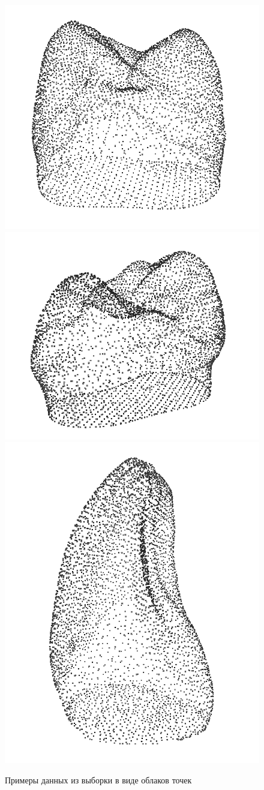\begin{figure}[ht!]
    \includegraphics[width=.3\textwidth]{images/snapshot1003.png}\hfill
    \includegraphics[width=.3\textwidth]{images/snapshot1004.png}\hfill
    \includegraphics[width=.3\textwidth]{images/snapshot1002.png}
    \label{fig:ex6}
    \caption{Примеры данных из выборки в виде облаков точек}
\end{figure}